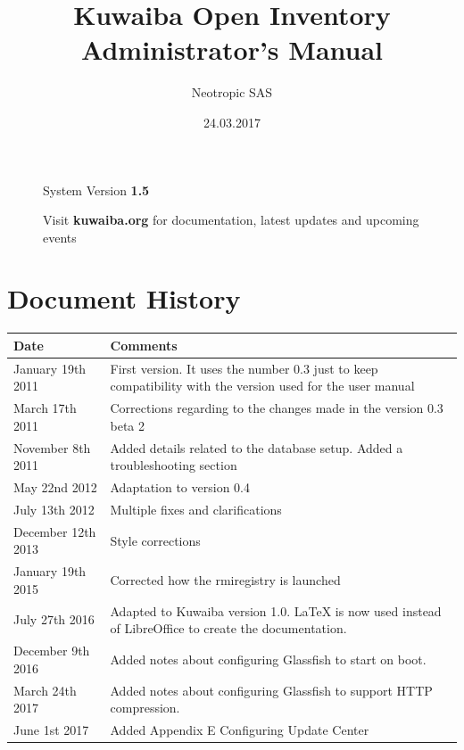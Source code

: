 \documentclass[a4paper]{article}
\title{Kuwaiba Open Inventory Administrator's Manual}
\author{Neotropic SAS}
\date{24.03.2017}
\begin{document}
	\maketitle
	
	
	
	\begin{figure}[b]
		\centering System Version \textbf{1.5}
			
		Visit \textbf{kuwaiba.org} for documentation, latest updates and upcoming events
	\end{figure}
	
	
	\newpage
	
	\tableofcontents

	\newpage
	\section{Document History}
		\begin{table}[h!]
			\centering
			\begin{tabular}{l||p{10cm}} %
				\toprule
				\textbf{Date} & \textbf{Comments}  \\
				\midrule
				January 19th 2011 & First version. It uses the number 0.3 just to keep compatibility with the version used for the user manual\\
				\midrule
				March 17th 2011 & Corrections regarding to the changes made in the version 0.3 beta 2 \\
				\midrule
				November 8th 2011 & Added details related to the database setup. Added a troubleshooting section \\
				\midrule
				May 22nd 2012 & Adaptation to version 0.4 \\
				\midrule
				July 13th 2012 & Multiple fixes and clarifications \\
				\midrule
				December 12th 2013 & Style corrections \\
				\midrule
				January 19th 2015 & Corrected how the rmiregistry is launched \\
				\midrule
				July 27th 2016 & Adapted to Kuwaiba version 1.0. LaTeX is now used instead of LibreOffice to create the documentation. \\
				\midrule
				December 9th 2016 & Added notes about configuring Glassfish to start on boot. \\
				\midrule
				March 24th 2017 & Added notes about configuring Glassfish to support HTTP compression. \\
				\midrule
				June 1st 2017 & Added Appendix E Configuring Update Center\\
				\bottomrule
			\end{tabular}	
				
		\end{table}
	\newpage
\end{document}
